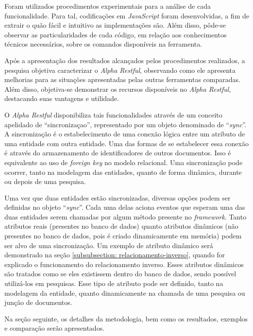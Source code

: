 Foram utilizados procedimentos experimentais para a análise de cada funcionalidade. Para tal, codificações em \textit{JavaScript} foram desenvolvidas, a fim de extrair o quão fácil e intuitivo as implementações são. Além disso, pôde-se observar as particularidades de cada código, em relação aos conhecimentos técnicos necessários, sobre os comandos disponíveis na ferramenta.

Após a apresentação dos resultados alcançados pelos procedimentos realizados, a pesquisa objetiva caracterizar o \textit{Alpha Restful}, observando como ele apresenta melhorias para as situações apresentadas pelas outras ferramentas comparadas. Além disso, objetiva-se demonstrar os recursos disponíveis no \textit{Alpha Restful}, destacando suas vantagens e utilidade.

O \textit{Alpha Restful} disponibiliza tais funcionalidades através de um conceito apelidado de ``sincronizaçao'', representado por um objeto denominado de ``\textit{sync}''. A sincronização é o estabelecimento de uma conexão lógica entre um atributo de uma entidade com outra entidade. Uma das formas de se estabelecer essa conexão é através do armazenamento de identificadores de outros documentos. Isso é equivalente ao uso de \textit{foreign key} no modelo relacional. Uma sincronização pode ocorrer, tanto na modelagem das entidades, quanto de forma dinâmica, durante ou depois de uma pesquisa.

Uma vez que duas entidades estão sincronizadas, diversas opções podem ser definidas no objeto ``\textit{sync}''. Cada uma delas aciona eventos que esperam uma das duas entidades serem chamadas por algum método presente no \textit{framework}. Tanto atributos reais (presentes no banco de dados) quanto atributos dinâmicos (não presentes no banco de dados, pois é criado dinamicamente em memória) podem ser alvo de uma sincronização. Um exemplo de atributo dinâmico será demonstrado na seção \ref{subsubsection: relacionamento-inverso}, quando for explicado o funcionamento do relacionamento inverso. Esses atributos dinâmicos são tratados como se eles existissem dentro do banco de dados, sendo possível utilizá-los em pesquisas. Esse tipo de atributo pode ser definido, tanto na modelagem da entidade, quanto dinamicamente na chamada de uma pesquisa ou junção de documentos.

Na seção seguinte, os detalhes da metodologia, bem como os resultados, exemplos e comparação serão apresentados.


